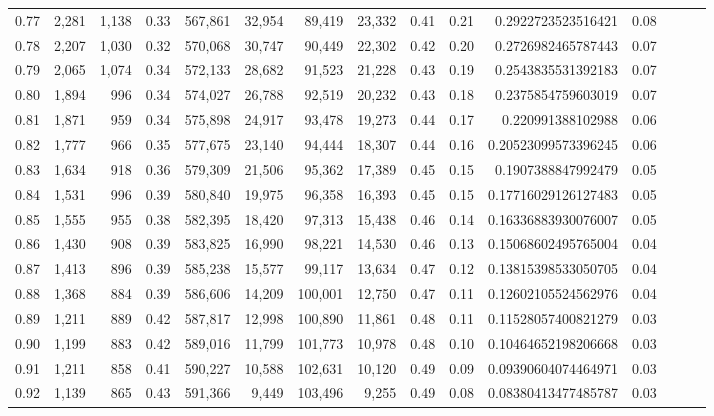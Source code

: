 \begin{tabular}{rrrrrrrrrrrrrrr}
0.77 &   2,281 &  1,138 &  0.33 &  567,861 &   32,954 &   89,419 &   23,332 &  0.41 &  0.21 &    0.2922723523516421 &      0.08 \\
0.78 &   2,207 &  1,030 &  0.32 &  570,068 &   30,747 &   90,449 &   22,302 &  0.42 &  0.20 &    0.2726982465787443 &      0.07 \\
0.79 &   2,065 &  1,074 &  0.34 &  572,133 &   28,682 &   91,523 &   21,228 &  0.43 &  0.19 &    0.2543835531392183 &      0.07 \\
0.80 &   1,894 &    996 &  0.34 &  574,027 &   26,788 &   92,519 &   20,232 &  0.43 &  0.18 &    0.2375854759603019 &      0.07 \\
0.81 &   1,871 &    959 &  0.34 &  575,898 &   24,917 &   93,478 &   19,273 &  0.44 &  0.17 &     0.220991388102988 &      0.06 \\
0.82 &   1,777 &    966 &  0.35 &  577,675 &   23,140 &   94,444 &   18,307 &  0.44 &  0.16 &   0.20523099573396245 &      0.06 \\
0.83 &   1,634 &    918 &  0.36 &  579,309 &   21,506 &   95,362 &   17,389 &  0.45 &  0.15 &    0.1907388847992479 &      0.05 \\
0.84 &   1,531 &    996 &  0.39 &  580,840 &   19,975 &   96,358 &   16,393 &  0.45 &  0.15 &   0.17716029126127483 &      0.05 \\
0.85 &   1,555 &    955 &  0.38 &  582,395 &   18,420 &   97,313 &   15,438 &  0.46 &  0.14 &   0.16336883930076007 &      0.05 \\
0.86 &   1,430 &    908 &  0.39 &  583,825 &   16,990 &   98,221 &   14,530 &  0.46 &  0.13 &   0.15068602495765004 &      0.04 \\
0.87 &   1,413 &    896 &  0.39 &  585,238 &   15,577 &   99,117 &   13,634 &  0.47 &  0.12 &   0.13815398533050705 &      0.04 \\
0.88 &   1,368 &    884 &  0.39 &  586,606 &   14,209 &  100,001 &   12,750 &  0.47 &  0.11 &   0.12602105524562976 &      0.04 \\
0.89 &   1,211 &    889 &  0.42 &  587,817 &   12,998 &  100,890 &   11,861 &  0.48 &  0.11 &   0.11528057400821279 &      0.03 \\
0.90 &   1,199 &    883 &  0.42 &  589,016 &   11,799 &  101,773 &   10,978 &  0.48 &  0.10 &   0.10464652198206668 &      0.03 \\
0.91 &   1,211 &    858 &  0.41 &  590,227 &   10,588 &  102,631 &   10,120 &  0.49 &  0.09 &   0.09390604074464971 &      0.03 \\
0.92 &   1,139 &    865 &  0.43 &  591,366 &    9,449 &  103,496 &    9,255 &  0.49 &  0.08 &   0.08380413477485787 &      0.03 \\

\end{tabular}
